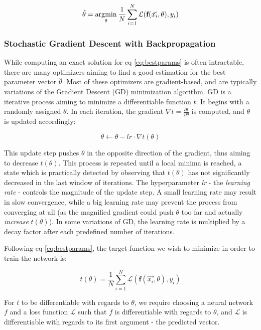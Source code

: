 \begin{equation}
\hat{\theta} = \operatorname*{\arg\!\min}_{\theta} \frac{1}{N}\sum_{i=1}^N \mathcal{L}(\textbf{f}(\vec{x_i}, \theta), y_i)
\label{eq:bestparams}    
\end{equation}

\subsubsection{Stochastic Gradient Descent with Backpropagation}
While computing an exact solution for eq \ref{eq:bestparams} is often intractable, there are many optimizers aiming to find a good estimation for the best parameter vector $\hat{\theta}$. Most of these optimizers are gradient-based, and are typically variations of the Gradient Descent (GD) minimization algorithm. GD is a iterative process aiming to minimize a differentiable function $t$. It begins with a randomly assigned $\theta$. In each iteration, the gradient $\nabla t = \frac{\partial t}{\partial \theta}$ is computed, and $\theta$ is updated accordingly:

$$ \theta \leftarrow \theta - \textit{lr} \cdot \nabla t(\theta) $$

This update step pushes $\theta$ in the opposite direction of the gradient, thus aiming to decrease $t(\theta)$. This process is repeated until a local minima is reached, a state which is practically detected by observing that $t(\theta)$ has not significantly decreased in the last window of iterations. The hyperparameter \textit{lr} - the \textit{learning rate} - controls the magnitude of the update step. A small learning rate may result in slow convergence, while a big learning rate may prevent the process from converging at all (as the magnified gradient could push $\theta$ too far and actually \emph{increase} $t(\theta)$). In some variations of GD, the learning rate is multiplied by a decay factor after each predefined number of iterations. 

Following eq \ref{eq:bestparams}, the target function we wish to minimize in order to train the network is:

$$ t(\theta) = \frac{1}{N}\sum_{i=1}^N \mathcal{L}(\textbf{f}(\vec{x_i}, \theta), y_i) $$

For $t$ to be differentiable with regards to $\theta$, we require choosing a neural network $f$ and a loss function $\mathcal{L}$ such that $f$ is differentiable with regards to $\theta$, and $\mathcal{L}$ is differentiable with regards to its first argument - the predicted vector.

